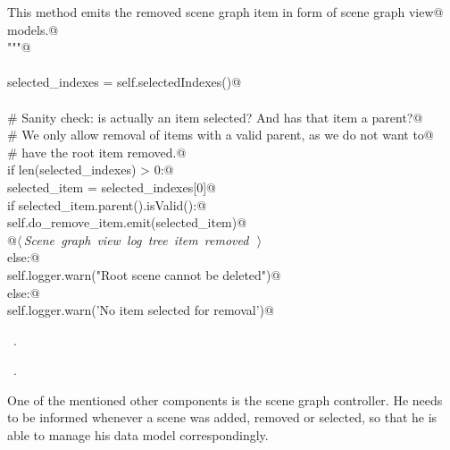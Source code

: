 \documentclass[
    a4paper,      %
    10pt,         %
    openright,    %
    notitlepage,  %
    parskip=half, %
]{scrreprt}       %
\theoremstyle{definition}                    %
\begin{document}
\begin{flushleft}
\begin{minipage}{\linewidth}
\begin{list}{}{}
\mbox{}\lstinline@    This method emits the removed scene graph item in form of scene graph view@\\
\mbox{}\lstinline@    models.@\\
\mbox{}\lstinline@    """@\\
\mbox{}\lstinline@@\\
\mbox{}\lstinline@    selected_indexes = self.selectedIndexes()@\\
\mbox{}\lstinline@@\\
\mbox{}\lstinline@    # Sanity check: is actually an item selected? And has that item a parent?@\\
\mbox{}\lstinline@    # We only allow removal of items with a valid parent, as we do not want to@\\
\mbox{}\lstinline@    # have the root item removed.@\\
\mbox{}\lstinline@    if len(selected_indexes) > 0:@\\
\mbox{}\lstinline@        selected_item = selected_indexes[0]@\\
\mbox{}\lstinline@        if selected_item.parent().isValid():@\\
\mbox{}\lstinline@            self.do_remove_item.emit(selected_item)@\\
\mbox{}\lstinline@            @\hbox{$\langle\,${\itshape Scene graph view log tree item removed}\nobreak\ {\footnotesize {}}$\,\rangle$}\lstinline@@\\
\mbox{}\lstinline@        else:@\\
\mbox{}\lstinline@            self.logger.warn("Root scene cannot be deleted")@\\
\mbox{}\lstinline@    else:@\\
\mbox{}\lstinline@        self.logger.warn('No item selected for removal')@\\
\mbox{}\lstinline@@{\NWsep}
\end{list}
\vspace{-1.5ex}
\footnotesize
\begin{list}{}{\setlength{\itemsep}{-\parsep}\setlength{\itemindent}{-\leftmargin}}
\item \NWtxtMacroDefBy\ .
\item \NWtxtMacroRefIn\ .

\item{}
\end{list}
\end{minipage}\vspace{4ex}
\end{flushleft}
One of the mentioned other components is the scene graph controller. He needs to
be informed whenever a scene was added, removed or selected, so that he is able to
manage his data model correspondingly.
\end{document}
